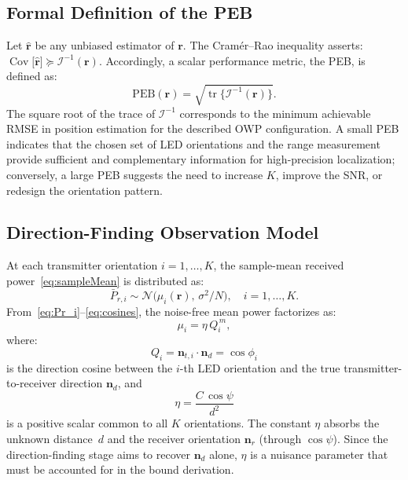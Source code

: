 \documentclass[journal]{IEEEtran}
\newcommand{\added}[1]{{\color{blue}#1}}
\newcommand{\deleted}[1]{{\color{red}#1}}
\begin{document}
\deleted{\subsection{Formal Definition of the PEB}
Let $\hat{\mathbf r}$ be any unbiased estimator of $\mathbf r$.  The
Cram\'{e}r--Rao inequality asserts:
$
\operatorname{Cov}\!\bigl[\hat{\mathbf r}\bigr]
\succeq
\mathcal{I}^{-1}(\mathbf r).
$
Accordingly, a scalar performance metric, the PEB, is defined as:
\begin{equation}
\mathrm{PEB}(\mathbf r)
= \sqrt{\operatorname{tr}\!\bigl\{\mathcal{I}^{-1}(\mathbf r)\bigr\}}.
\end{equation}
The square root of the trace of $\mathcal{I}^{-1}$ corresponds to the minimum achievable
RMSE in position estimation for the described OWP configuration.
A small PEB indicates that the chosen set of LED orientations and the range measurement
provide sufficient and complementary information for high-precision localization; conversely,
a large PEB suggests the need to increase $K$, improve the SNR,
or redesign the orientation pattern.}

\added{\subsection{Direction-Finding Observation Model}

At each transmitter orientation $i=1,\ldots,K$, the sample-mean received power~\eqref{eq:sampleMean} is distributed as:
\begin{equation}
\bar P_{r,i} \sim 
  \mathcal{N}\!\bigl(\mu_{i}(\mathbf r),\,\sigma^{2}/N\bigr),
\quad i=1,\dots,K.
\end{equation}
From~\eqref{eq:Pr_i}--\eqref{eq:cosines}, the noise-free mean power factorizes as:
\begin{equation}
\mu_i = \eta\,Q_i^{\,m},
\label{eq:mu_factorized}
\end{equation}
where:
\begin{equation}
Q_i = \mathbf{n}_{t,i}\cdot\mathbf{n}_d = \cos\phi_i
\label{eq:Q}
\end{equation}
is the direction cosine between the $i$-th LED orientation and the true transmitter-to-receiver direction $\mathbf{n}_d$, and
\begin{equation}
\eta = \frac{C\,\cos\psi}{d^2}
\label{eq:eta_nuisance}
\end{equation}
is a positive scalar common to all $K$ orientations.  The constant $\eta$ absorbs the unknown distance~$d$ and the receiver orientation $\mathbf{n}_r$ (through $\cos\psi$).  Since the direction-finding stage aims to recover $\mathbf{n}_d$ alone, $\eta$ is a nuisance parameter that must be accounted for in the bound derivation.}
\end{document}
